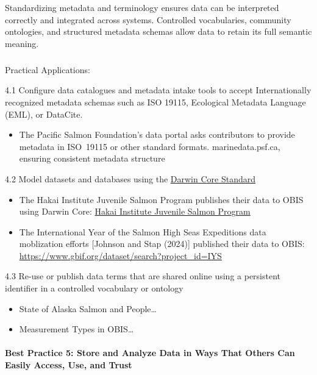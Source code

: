 \documentclass[
  letterpaper,
  DIV=11,
  numbers=noendperiod]{scrartcl}
\makeatletter
\let\oldparagraph\paragraph
\renewcommand{\paragraph}{
    \@ifstar
      \xxxParagraphStar
      \xxxParagraphNoStar
  }
\newcommand{\xxxParagraphStar}[1]{\oldparagraph*{#1}\mbox{}}
\newcommand{\xxxParagraphNoStar}[1]{\oldparagraph{#1}\mbox{}}
\let\oldsubparagraph\subparagraph
\renewcommand{\subparagraph}{
    \@ifstar
      \xxxSubParagraphStar
      \xxxSubParagraphNoStar
  }
\newcommand{\xxxSubParagraphStar}[1]{\oldsubparagraph*{#1}\mbox{}}
\newcommand{\xxxSubParagraphNoStar}[1]{\oldsubparagraph{#1}\mbox{}}
\providecommand{\tightlist}{%
  \setlength{\itemsep}{0pt}\setlength{\parskip}{0pt}}\usepackage{longtable,booktabs,array}
\makeatother
\begin{document}
Standardizing metadata and terminology ensures data can be interpreted
correctly and integrated across systems. Controlled vocabularies,
community ontologies, and structured metadata schemas allow data to
retain its full semantic meaning.

\subparagraph{Practical Applications:}\label{practical-applications-3}

4.1 Configure data catalogues and metadata intake tools to accept
Internationally recognized metadata schemas such as ISO 19115,
Ecological Metadata Language (EML), or DataCite.

\begin{itemize}
\tightlist
\item
  The Pacific Salmon Foundation's data portal asks contributors to
  provide metadata in ISO~19115 or other standard formats.
  marinedata.psf.ca, ensuring consistent metadata structure
\end{itemize}

4.2 Model datasets and databases using the
\href{https://dwc.tdwg.org/}{Darwin Core Standard}

\begin{itemize}
\item
  The Hakai Institute Juvenile Salmon Program publishes their data to
  OBIS using Darwin Core:
  \href{https://www.gbif.org/dataset/72de3af4-1572-4f2d-8006-2bfa2007065c}{Hakai
  Institute Juvenile Salmon Program}
\item
  The International Year of the Salmon High Seas Expeditions data
  moblization efforts {[}Johnson and Stap (2024){]} published their data
  to OBIS: \url{https://www.gbif.org/dataset/search?project_id=IYS}
\end{itemize}

4.3 Re-use or publish data terms that are shared online using a
persistent identifier in a controlled vocabulary or ontology

\begin{itemize}
\item
  State of Alaska Salmon and People\ldots{}
\item
  Measurement Types in OBIS\ldots{}
\end{itemize}

\paragraph{\texorpdfstring{\textbf{Best Practice 5: Store and Analyze
Data in Ways That Others Can Easily Access, Use, and
Trust}}{Best Practice 5: Store and Analyze Data in Ways That Others Can Easily Access, Use, and Trust}}\label{best-practice-5-store-and-analyze-data-in-ways-that-others-can-easily-access-use-and-trust}
\end{document}
